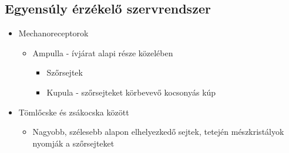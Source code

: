 \documentclass{article}
\begin{document}

\subsection{Egyensúly érzékelő szervrendszer}
\begin{itemize}
    \item Mechanoreceptorok \begin{itemize}
        \item Ampulla - ívjárat alapi része közelében \begin{itemize}
            \item Szőrsejtek 
            \item Kupula - szőrsejteket körbevevő kocsonyás kúp
        \end{itemize}
    \end{itemize}
    \item Tömlőcske és zsákocska között \begin{itemize}
        \item Nagyobb, szélesebb alapon elhelyezkedő sejtek, tetején mészkristályok nyomják a szőrsejteket
    \end{itemize}
\end{itemize}
\end{document}
